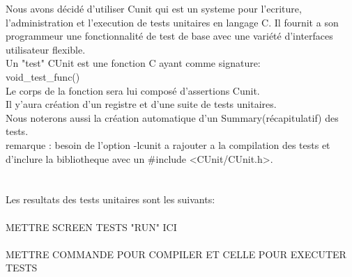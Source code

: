 \documentclass[a4]{article}
\begin{document}
Nous avons décidé d'utiliser Cunit qui est un systeme pour l'ecriture, l'administration et l'execution de tests unitaires
en langage C. Il fournit a son programmeur une fonctionnalité de test de base avec une variété d'interfaces utilisateur flexible.\\
Un "test"  CUnit est une fonction C ayant comme signature:\\
void\_test\_func()\\
Le corps de la fonction sera lui composé d'assertions Cunit.\\
Il y'aura création d'un registre et d'une suite de tests unitaires.\\
Nous noterons aussi la création automatique d'un Summary(récapitulatif) des tests.\\
remarque : besoin de l'option -lcunit a rajouter a la compilation des tests et d'inclure la bibliotheque avec un
\#include <CUnit/CUnit.h>.\\ \\ \\ 

  
Les resultats des tests unitaires sont les suivants:\\ \\ 
METTRE SCREEN TESTS "RUN" ICI \\ \\

		METTRE COMMANDE POUR COMPILER ET CELLE POUR EXECUTER TESTS
\end{document}
